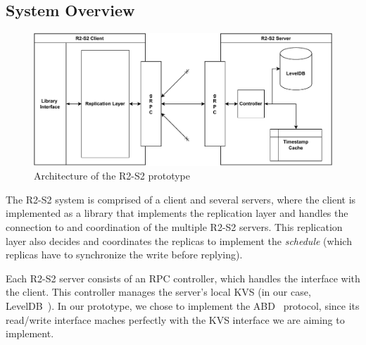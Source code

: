 \subsection{System Overview}\label{ssec:r2s2overview}

\begin{figure}[t]
    \centering
    \includegraphics[width=\linewidth]{img/r2s2_arch}
    \caption{Architecture of the \ac{R2-S2}
    prototype}\label{fig:r2s2arch}
\end{figure}

The \ac{R2-S2} system is comprised of a client and several
servers, where the client is implemented as a library that
implements the replication layer and handles the connection to
and coordination of the multiple \ac{R2-S2} servers. This
replication layer also decides and coordinates the replicas to
implement the \emph{schedule} (which replicas have to synchronize
the write before replying).

Each \ac{R2-S2} server consists of an RPC controller, which
handles the interface with the client. This controller manages
the server's local \ac{KVS} (in our case,
LevelDB~\cite{leveldb}). In our prototype, we chose to implement
the ABD~\cite{abd} protocol, since its read/write interface
maches perfectly with the \ac{KVS} interface we are aiming to
implement.

